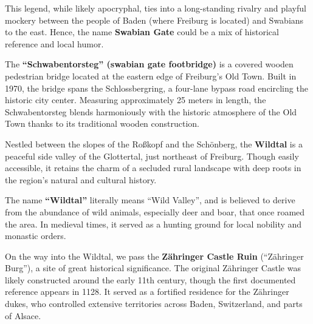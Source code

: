 \documentclass[landscape, a4paper]{article}
\newcommand\alert[1]{\textcolor{PrimaryColor}{\textbf{#1}}}
\begin{document}
\begin{minipage}[t]{0.31\textwidth}
{		This legend, while likely apocryphal, ties into a long-standing rivalry and playful mockery between the people of Baden (where Freiburg is located) and Swabians to the east. Hence, the name \alert{Swabian Gate} could be a mix of historical reference and local humor.


		The \alert{\enquote{Schwabentorsteg} (swabian gate footbridge)} is a covered wooden pedestrian bridge located at the eastern edge of Freiburg’s Old Town. Built in 1970, the bridge spans the Schlossbergring, a four-lane bypass road encircling the historic city center. Measuring approximately 25 meters in length, the Schwabentorsteg blends harmoniously with the historic atmosphere of the Old Town thanks to its traditional wooden construction.

		Nestled between the slopes of the Roßkopf and the Schönberg, the \alert{Wildtal} is a peaceful side valley of the Glottertal, just northeast of Freiburg. Though easily accessible, it retains the charm of a secluded rural landscape with deep roots in the region’s natural and cultural history.

		The name \alert{\enquote{Wildtal}} literally means \enquote{Wild Valley}, and is believed to derive from the abundance of wild animals, especially deer and boar, that once roamed the area. In medieval times, it served as a hunting ground for local nobility and monastic orders. %

		On the way into the Wildtal, we pass the \alert{Zähringer Castle Ruin} (\enquote{Zähringer Burg}), a site of great historical significance. The original Zähringer Castle was likely constructed around the early 11th century, though the first documented reference appears in 1128. It served as a fortified residence for the Zähringer dukes, who controlled extensive territories across Baden, Switzerland, and parts of Alsace.
	}{
	}
\end{minipage}%
\hfill\color{white}%
\vrule width 0.01cm
\hfill\color{black}%
\end{document}
